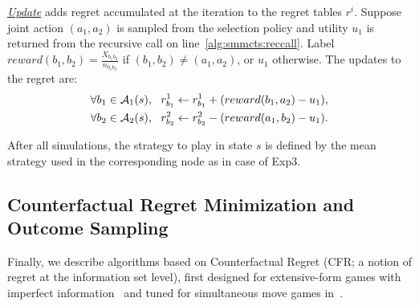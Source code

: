 \emph{\underline{Update}} adds regret accumulated at the iteration to
the regret tables $r^i$. Suppose joint action $(a_1,a_2)$ is
sampled from the selection policy and utility $u_1$ is returned from the recursive call on line~\ref{alg:smmcts:reccall}.
Label $reward(b_1,b_2) = \frac{X_{b_1b_2}}{n_{b_1b_2}}$ if
$(b_1,b_2) \not= (a_1,a_2)$, or $u_1$ otherwise. The updates to the regret are:
\begin{eqnarray}
\forall b_1 \in \mathcal{A}_1(s), ~~  r^1_{b_1} \leftarrow r^1_{b_1} + ( reward(b_1, a_2) - u_1 ),\\
\forall b_2 \in \mathcal{A}_2(s), ~~  r^2_{b_2} \leftarrow r^2_{b_2} - ( reward(a_1, b_2) - u_1).
\end{eqnarray}

After all simulations, the strategy to play in state $s$ is defined by the mean strategy used in the corresponding node as in case of Exp3.

\subsection{Counterfactual Regret Minimization and Outcome Sampling} \label{sec:algs:cfros}
Finally, we describe algorithms based on Counterfactual Regret (CFR; a notion of regret at the information set level), first designed for extensive-form games with imperfect information~\cite{CFR} and tuned for simultaneous move games in~\cite{Lanctot13Goofspiel}.

